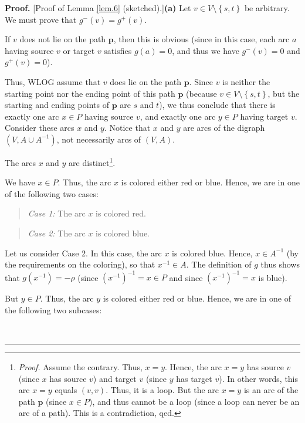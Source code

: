 \documentclass[numbers=enddot,12pt,final,onecolumn,notitlepage]{scrartcl}%
\theoremstyle{definition}
\newenvironment{statement}{\begin{quote}}{\end{quote}}
\newenvironment{proof}[1][Proof]{\noindent\textbf{#1.} }{\ \rule{0.5em}{0.5em}}
\begin{document}
\begin{proof}
[Proof of Lemma \ref{lem.6} (sketched).]\textbf{(a)} Let $v\in V\setminus
\left\{  s,t\right\}  $ be arbitrary. We must prove that $g^{-}\left(
v\right)  =g^{+}\left(  v\right)  $.

If $v$ does not lie on the path $\mathbf{p}$, then this is obvious (since in
this case, each arc $a$ having source $v$ or target $v$ satisfies $g\left(
a\right)  =0$, and thus we have $g^{-}\left(  v\right)  =0$ and $g^{+}\left(
v\right)  =0$).

Thus, WLOG assume that $v$ does lie on the path $\mathbf{p}$. Since $v$ is
neither the starting point nor the ending point of this path $\mathbf{p}$
(because $v\in V\setminus\left\{  s,t\right\}  $, but the starting and ending
points of $\mathbf{p}$ are $s$ and $t$), we thus conclude that there is
exactly one arc $x\in P$ having source $v$, and exactly one arc $y\in P$
having target $v$. Consider these arcs $x$ and $y$. Notice that $x$ and $y$
are arcs of the digraph $\left(  V,A\cup A^{-1}\right)  $, not necessarily
arcs of $\left(  V,A\right)  $.

The arcs $x$ and $y$ are distinct\footnote{\textit{Proof.} Assume the
contrary. Thus, $x=y$. Hence, the arc $x=y$ has source $v$ (since $x$ has
source $v$) and target $v$ (since $y$ has target $v$). In other words, this
arc $x=y$ equals $\left(  v,v\right)  $. Thus, it is a loop. But the arc $x=y$
is an arc of the path $\mathbf{p}$ (since $x\in P$), and thus cannot be a loop
(since a loop can never be an arc of a path). This is a contradiction, qed.}.

We have $x\in P$. Thus, the arc $x$ is colored either red or blue. Hence, we
are in one of the following two cases:

\begin{statement}
\textit{Case 1:} The arc $x$ is colored red.
\end{statement}

\begin{statement}
\textit{Case 2:} The arc $x$ is colored blue.
\end{statement}

Let us consider Case 2. In this case, the arc $x$ is colored blue. Hence,
$x\in A^{-1}$ (by the requirements on the coloring), so that $x^{-1}\in A$.
The definition of $g$ thus shows that $g\left(  x^{-1}\right)  =-\rho$ (since
$\left(  x^{-1}\right)  ^{-1}=x\in P$ and since $\left(  x^{-1}\right)
^{-1}=x$ is blue).

But $y\in P$. Thus, the arc $y$ is colored either red or blue. Hence, we are
in one of the following two subcases:


\end{proof}
\end{document}
